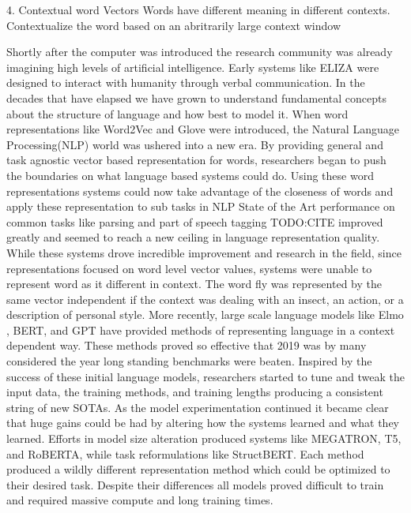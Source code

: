 \documentclass [11pt, proquest] {uwthesis}[2020/08/20]
\begin{document}
4. Contextual word Vectors
    Words have different meaning in different contexts. 
    Contextualize the word based on an abritrarily large context window

Shortly after the computer was introduced the research community was already imagining high levels of artificial intelligence. Early systems like ELIZA \cite{Weizenbaum1966ELIZAA} were designed to interact with humanity through verbal communication. In the decades that have elapsed we have grown to understand fundamental concepts about the structure of language and how best to model it. When word representations like Word2Vec \cite{Mikolov2013EfficientEO} and Glove \cite{Pennington2014GloveGV} were introduced, the Natural Language Processing(NLP) world was ushered into a new era. By providing general and task agnostic vector based representation for words, researchers began to push the boundaries on what language based systems could do. Using these word representations systems could now take advantage of the closeness of words and apply these representation to sub tasks in NLP State of the Art performance on common tasks like parsing and part of speech tagging TODO:CITE improved greatly and seemed to reach a new ceiling in language representation quality. \\ While these systems drove incredible improvement and research in the field, since representations focused on word level vector values, systems were unable to represent word as it different in context. The word fly was represented by the same vector independent if the context was dealing with an insect, an action, or a description of personal style. More recently, large scale language models like Elmo \cite{Peters2018DeepCW}, BERT, and GPT have provided methods of representing language in a context dependent way. These methods proved so effective that 2019 was by many considered the year long standing benchmarks were beaten. Inspired by the success of these initial language models, researchers started to tune and tweak the input data, the training methods, and training lengths producing a consistent string of new SOTAs. As the model experimentation continued it became clear that huge gains could be had by altering how the systems learned and what they learned. Efforts in model size alteration produced systems like MEGATRON, T5, and RoBERTA, while task reformulations like StructBERT. Each method produced a wildly different representation method which could be optimized to their desired task. Despite their differences all models proved difficult to train and required massive compute and long training times.   \\
\end{document}
